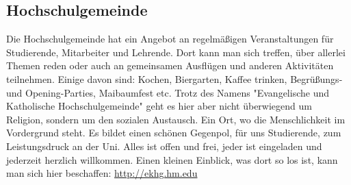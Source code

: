 \subsection{Hochschulgemeinde}
Die Hochschulgemeinde hat ein Angebot an regelmäßigen 
Veranstaltungen für Studierende, Mitarbeiter und Lehrende. Dort kann 
man sich treffen, über allerlei Themen reden oder auch an gemeinsamen 
Ausflügen und anderen Aktivitäten teilnehmen. Einige davon sind: 
Kochen, Biergarten, Kaffee trinken, Begrüßungs- und Opening-Parties, 
Maibaumfest etc. \doublebreak
Trotz des Namens "Evangelische und Katholische Hochschulgemeinde" 
geht es hier aber nicht überwiegend um Religion, sondern um den 
sozialen Austausch. Ein Ort, wo die Menschlichkeit im Vordergrund 
steht. Es bildet einen schönen Gegenpol, für uns Studierende, zum 
Leistungsdruck an der Uni. \doublebreak
Alles ist offen und frei, jeder ist eingeladen und jederzeit herzlich 
willkommen. \doublebreak
Einen kleinen Einblick, was dort so los ist, kann man sich hier beschaffen: 
\url{http://ekhg.hm.edu} 